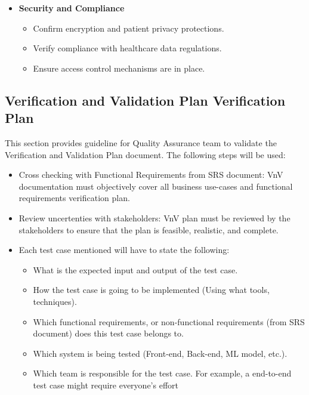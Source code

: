 \documentclass[12pt, titlepage]{article}
\begin{document}
\begin{itemize}
    \item \textbf{Security and Compliance}
    \begin{itemize}
        \item Confirm encryption and patient privacy protections.
        \item Verify compliance with healthcare data regulations.
        \item Ensure access control mechanisms are in place.
    \end{itemize}
\end{itemize}
\subsection{Verification and Validation Plan Verification Plan}

This section provides guideline for Quality Assurance team to validate the Verification and Validation Plan document. The following steps will be used:
\begin{itemize}
  \item{Cross checking with Functional Requirements from SRS document: VnV documentation must objectively cover all business use-cases and functional requirements verification plan.}
  \item{Review uncertenties with stakeholders: VnV plan must be reviewed by the stakeholders to ensure that the plan is feasible, realistic, and complete.}
  \item{Each test case mentioned will have to state the following:}
  \begin{itemize}
    \item{What is the expected input and output of the test case.}
    \item{How the test case is going to be implemented (Using what tools, techniques).}
    \item{Which functional requirements, or non-functional requirements (from SRS document) does this test case belongs to.}
    \item{Which system is being tested (Front-end, Back-end, ML model, etc.).}
    \item{Which team is responsible for the test case. For example, a end-to-end test case might require everyone's effort}
  \end{itemize}
\end{itemize}
\end{document}
